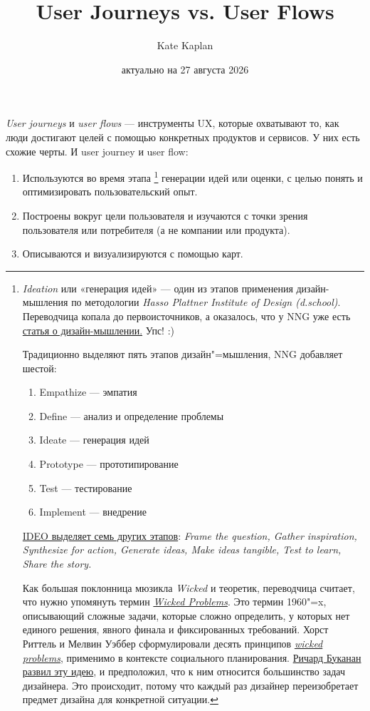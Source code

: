 \documentclass[a4paper,12pt]{article}
\begin{document}
\title{User Journeys vs. User Flows}
\author{Kate Kaplan}
\date{актуально на 27 августа 2026}

\maketitle

\textit{User journeys} и \textit{user flows} — инструменты UX, которые охватывают то, как люди достигают целей с помощью конкретных продуктов и сервисов. У них есть схожие черты. И user journey и user flow:

\begin{enumerate}
	\item Используются во время этапа
		\footnote{
			\textit{Ideation} или «генерация идей» --- один из этапов применения дизайн-мышления по методологии \textit{Hasso Plattner Institute of Design (d.school)}. Переводчица копала до первоисточников, а оказалось, что у NNG уже есть \href{https://www.nngroup.com/articles/design-thinking/}{статья о дизайн-мышлении.} Упс! :) 
			\par
			Традиционно выделяют пять этапов дизайн"=мышления, NNG добавляет шестой: 
				\begin{enumerate}
					\item Empathize --- эмпатия
					\item Define --- анализ и определение проблемы
					\item Ideate --- генерация идей
					\item Prototype --- прототипирование
					\item Test --- тестирование
					\item Implement --- внедрение
				\end{enumerate} 
			\href{https://designthinking.ideo.com/process}{IDEO выделяет семь других этапов}: \textit{Frame the question, Gather inspiration, Synthesize for action, Generate ideas, Make ideas tangible, Test to learn, Share the story.}
			\par
			Как большая поклонница мюзикла \textit{Wicked} и теоретик, переводчица считает, что нужно упомянуть термин \textit{\href{https://ixdf.org/literature/topics/wicked-problems}{Wicked Problems}}. Это термин 1960"=x, описывающий сложные задачи, которые сложно определить, у которых нет единого решения, явного финала и фиксированных требований. Хорст Риттель и Мелвин Уэббер сформулировали десять принципов \textit{\href{https://www.sympoetic.net/Managing_Complexity/complexity_files/1973\%20Rittel\%20and\%20Webber\%20Wicked\%20Problems.pdf}{wicked problems}}, применимо в контексте социального планирования. \href{https://www.researchgate.net/publication/251880127_Wicked_Problems_in_Design_Thinking}{Ричард Буканан развил эту идею}, и предположил, что к ним относится большинство задач дизайнера. Это происходит, потому что каждый раз дизайнер переизобретает предмет дизайна для конкретной ситуации.
		}
		генерации идей или оценки, с целью понять и оптимизировать пользовательский опыт.
	\item Построены вокруг цели пользователя и изучаются с точки зрения пользователя или потребителя (а не компании или продукта).
	\item Описываются и визуализируются с помощью карт.

\end{enumerate}
\end{document}

